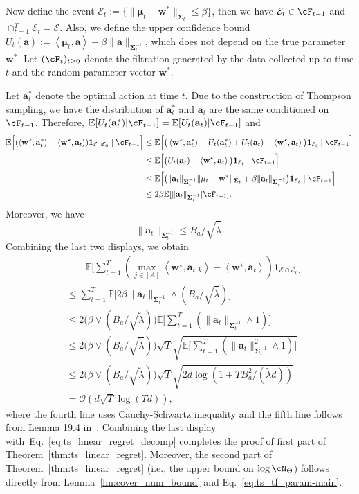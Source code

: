 \documentclass[10pt]{article}
\renewcommand{\cO}{\mathcal{O}}
\newcommand{\<}{\left\langle}
\renewcommand{\>}{\right\rangle}
\newcommand{\bone}{{\mathbf 1}}
\newcommand{\E}{\mathbb{E}}
\newcommand{\Tpsmean}{{{\mathbf\mu}}}
\newcommand{\Tpscov}{{{\mathbf\Sigma}}}
\newcommand{\hpevent}{{\mathcal E}}
\newcommand{\tfparspace}{{\Theta}}
\def\ba{{\mathbf a}}
\def\bw{{\mathbf w}}
\begin{document}
Now define the event $\hpevent_t:=\{\|\Tpsmean_t-\bw^*\|_{\Tpscov_t}\leq\beta\}$,  then  we have $\hpevent_t\in\cF_{t-1}$  and $\cap_{t=1}^T \hpevent_t=\hpevent$. Also, we define the upper confidence bound $U_t(\ba):=\<\Tpsmean_t,\ba\>+\beta\|\ba\|_{\Tpscov_t^{-1}}$, which does not depend on the true parameter $\bw^*$. Let $(\cF_{t})_{t\geq 0}$ denote the filtration generated by the data collected up to time $t$ and the random parameter vector $\bw^*$. 

Let $\ba_t^*$ denote the optimal action at time $t$. Due to the construction of Thompson sampling, we have the distribution of $\ba_t^*$ and $\ba_t$ are the same conditioned on $\cF_{t-1}$. Therefore, $\E[U_t(\ba_t^*)|\cF_{t-1}]=\E[U_t(\ba_t)|\cF_{t-1}]$ and
\begin{align*}
    \E\Big[ (\<\bw^\star,\ba_{t}^*\>-\<\bw^\star,\ba_{t}\>) \bone_{\hpevent\cap\hpevent_0}\mid\cF_{t-1}\Big]
   &\leq
\E\Big[ \big(\<\bw^\star,\ba_{t}^*\>-U_t(\ba_t^*)+U_t(\ba_t)-\<\bw^\star,\ba_{t}\>\big) \bone_{\hpevent_t}\mid\cF_{t-1}\Big]\\
    &\leq
  \E\Big[ \big(U_t(\ba_t)-\<\bw^\star,\ba_{t}\>\big) \bone_{\hpevent_t}\mid\cF_{t-1}\Big]\\
   &\leq
  \E\Big[ \big(\|\ba_t\|_{\Tpscov_t^{-1}}\|\Tpsmean_t-\bw^*\|_{\Tpscov_t} +\beta \|\ba_t\|_{\Tpscov_t^{-1}} \big)\bone_{\hpevent_t}\mid\cF_{t-1}\Big]\\
    &\leq
   2 \beta\E[\|\ba_t\|_{\Tpscov_t^{-1}}|\cF_{t-1}].
\end{align*}
Moreover, we have $$\|\ba_t\|_{\Tpscov_t^{-1}}\leq B_a/\sqrt{\tilde\lambda}.$$ 
Combining the last two displays, we obtain
\begin{align*}
     &\qquad\E\Big[\sum_{t=1}^T (\max_{j\in[A]}\<\bw^\star,\ba_{t,k}\>-\<\bw^\star,\ba_{t}\>) \bone_{\hpevent\cap\hpevent_0}\Big]\\
    &\leq\sum_{t=1}^T \E\Big[2 \beta \|\ba_t\|_{\Tpscov_t^{-1}}\wedge({B_a}/{\sqrt{\tilde\lambda}})\Big]\\
    &\leq 
    2\big(\beta\vee ({B_a}/{\sqrt{\tilde\lambda}})\big)\E\Big[\sum_{t=1}^T (\|\ba_t\|_{\Tpscov_t^{-1}}\wedge1)\Big]\\
    &\leq 
    2\big(\beta\vee ({B_a}/{\sqrt{\tilde\lambda}})\big)\sqrt{T}\sqrt{\E\Big[\sum_{t=1}^T (\|\ba_t\|^2_{\Tpscov_t^{-1}}\wedge1)\Big]}\\
    &\leq
    2\big(\beta\vee ({B_a}/{\sqrt{\tilde\lambda}})\big)\sqrt{T}\sqrt{2d\log(1+TB_a^2/(\tilde\lambda d))}\\
    &= \cO( d\sqrt{T}\log(Td)),
\end{align*}
where the  fourth line uses  Cauchy-Schwartz inequality and the fifth line follows from Lemma 19.4 in~\cite{lattimore2020bandit}. Combining the last display with~Eq.~\eqref{eq:ts_linear_regret_decomp} completes the proof of first part of Theorem~\ref{thm:ts_linear_regret}. Moreover, the second part of Theorem~\ref{thm:ts_linear_regret}  (i.e., the upper bound on $\log\cN_{\tfparspace}$) follows directly from Lemma~\ref{lm:cover_num_bound} and Eq.~\eqref{eq:ts_tf_param-main}. 
\end{document}
